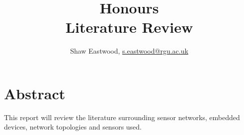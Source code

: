 \documentclass{article}
\title{Honours \\ Literature Review}
\author{Shaw Eastwood, \url{s.eastwood@rgu.ac.uk}}
\begin{document}
\maketitle

\section{Abstract}
This report will review the literature surrounding sensor networks, embedded devices, network topologies and sensors used.










\end{document}
